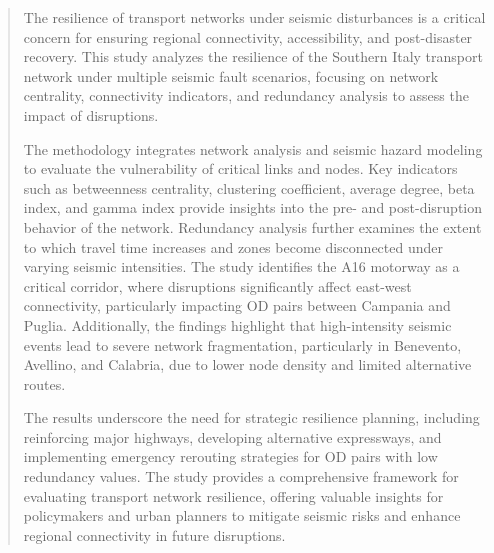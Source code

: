 \documentclass[a4paper, 12pt, oneside]{report} %
\begin{document}
\begin{abstract}
    \noindent The resilience of transport networks under seismic disturbances is a critical concern for ensuring regional connectivity, accessibility, and post-disaster recovery. This study analyzes the resilience of the Southern Italy transport network under multiple seismic fault scenarios, focusing on network centrality, connectivity indicators, and redundancy analysis to assess the impact of disruptions.

    The methodology integrates network analysis and seismic hazard modeling to evaluate the vulnerability of critical links and nodes. Key indicators such as betweenness centrality, clustering coefficient, average degree, beta index, and gamma index provide insights into the pre- and post-disruption behavior of the network. Redundancy analysis further examines the extent to which travel time increases and zones become disconnected under varying seismic intensities. The study identifies the A16 motorway as a critical corridor, where disruptions significantly affect east-west connectivity, particularly impacting OD pairs between Campania and Puglia. Additionally, the findings highlight that high-intensity seismic events lead to severe network fragmentation, particularly in Benevento, Avellino, and Calabria, due to lower node density and limited alternative routes.

    The results underscore the need for strategic resilience planning, including reinforcing major highways, developing alternative expressways, and implementing emergency rerouting strategies for OD pairs with low redundancy values. The study provides a comprehensive framework for evaluating transport network resilience, offering valuable insights for policymakers and urban planners to mitigate seismic risks and enhance regional connectivity in future disruptions.
\end{abstract}

\newpage 
\dominitoc
\tableofcontents

\listoffigures

\listoftables

 
 
 




\printbibliography
\end{document}

